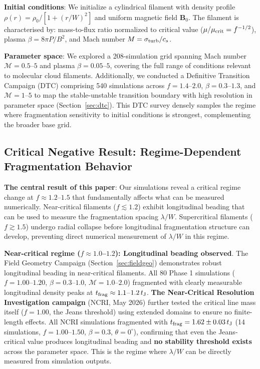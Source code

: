\documentclass[twoside,twocolumn]{mnras}
\begin{document}
\textbf{Initial conditions}: We initialize a cylindrical filament with density profile $\rho(r) = \rho_0 / [1 + (r/W)^2]$ and uniform magnetic field $\mathbf{B}_0$. The filament is characterised by: mass-to-flux ratio normalized to critical value ($\mu/\mu_{\rm crit} = f^{-1/2}$), plasma $\beta = 8\pi P/B^2$, and Mach number $M = \sigma_{\rm turb}/c_s$.

\textbf{Parameter space}: We explored a 208-simulation grid spanning Mach number $\mathcal{M} = 0.5$--$5$ and plasma $\beta = 0.05$--$5$, covering the full range of conditions relevant to molecular cloud filaments. Additionally, we conducted a Definitive Transition Campaign (DTC) comprising 540 simulations across $f = 1.4$--$2.0$, $\beta = 0.3$--$1.3$, and $\mathcal{M} = 1$--$5$ to map the stable-unstable transition boundary with high resolution in parameter space (Section~\ref{sec:dtc}). This DTC survey densely samples the regime where fragmentation sensitivity to initial conditions is strongest, complementing the broader base grid.

\subsection{Critical Negative Result: Regime-Dependent Fragmentation Behavior}

\textbf{The central result of this paper}: Our simulations reveal a critical regime change at $f \approx 1.2$--$1.5$ that fundamentally affects what can be measured numerically. Near-critical filaments ($f \lesssim 1.2$) exhibit longitudinal beading that can be used to measure the fragmentation spacing $\lambda/W$. Supercritical filaments ($f \gtrsim 1.5$) undergo radial collapse before longitudinal fragmentation structure can develop, preventing direct numerical measurement of $\lambda/W$ in this regime.

\textbf{Near-critical regime ($f \approx 1.0$--$1.2$): Longitudinal beading observed}. The Field Geometry Campaign (Section~\ref{sec:fieldgeo}) demonstrates robust longitudinal beading in near-critical filaments. All 80 Phase 1 simulations ($f = 1.00$--$1.20$, $\beta = 0.3$--$1.0$, $\mathcal{M} = 1.0$--$2.0$) fragmented with clearly measurable longitudinal density peaks at $t_{\rm frag} \approx 1.1$--$1.2\,t_{\rm J}$. \textbf{The Near-Critical Resolution Investigation campaign} (NCRI, May 2026) further tested the critical line mass itself ($f = 1.00$, the Jeans threshold) using extended domains to ensure no finite-length effects. All NCRI simulations fragmented with $t_{\rm frag} = 1.62 \pm 0.03\,t_{\rm J}$ (14 simulations, $f = 1.00$--$1.50$, $\beta = 0.3$, $\theta = 0^{\circ}$), confirming that even the Jeans-critical value produces longitudinal beading and \textbf{no stability threshold exists} across the parameter space. This is the regime where $\lambda/W$ can be directly measured from simulation outputs.
\end{document}
